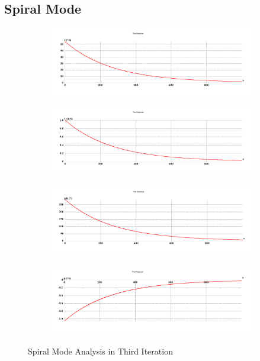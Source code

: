 \subsection{Spiral Mode}
\begin{figure}[H]
\begin{subfigure}{0.48\textwidth}
\includegraphics[width = \linewidth]{r (3).png}
\end{subfigure}
\begin{subfigure}{0.48\textwidth}
\includegraphics[width = \linewidth]{v (3).png}
\end{subfigure}
\medskip
\begin{subfigure}{0.48\textwidth}
\includegraphics[width = \linewidth]{phi (3).png}
\end{subfigure}
\begin{subfigure}{0.48\textwidth}
\includegraphics[width = \linewidth]{p (3).png}
\end{subfigure}
\caption{Spiral Mode Analysis in Third Iteration}
\end{figure}
